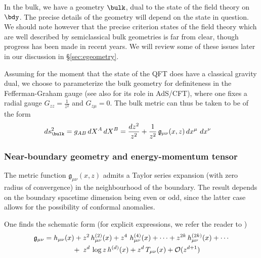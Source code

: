 \documentclass[12pt,openany]{book}
\begin{document}
In the bulk, we have a geometry $\bulk$, dual to the state of the field theory on $\bdy$. The precise details of the geometry will depend on the state in question. We should note however that the precise criterion states of the field theory which are well described by semiclassical bulk geometries is far from clear, though progress has been made in recent years. We will review some of these issues later in our discussion in \S\ref{sec:egeometry}.

 Assuming for the moment that the state of the QFT does have a classical gravity dual, we choose to parameterize the bulk geometry for definiteness in the Fefferman-Graham gauge \cite{Fefferman:1985aa} (see also \cite{deHaro:2000vlm} for its role in AdS/CFT), where one fixes a radial gauge $G_{zz} =\frac{1}{z^2}$ and $G_{z\mu}=0$. The bulk metric can thus be taken to be of the form
%
\begin{align}
ds^2_\bulk &= g_{AB}\, dX^A\, dX^B = \frac{dz^2}{z^2} + \frac{1}{z^2} \, \mathfrak{g}_{\mu\nu}(x,z)\, dx^\mu \ dx^\nu
\label{eq:bulkmet}
\end{align}
%

\subsubsection{Near-boundary geometry and energy-momentum tensor}


The metric function $\mathfrak{g}_{\mu\nu}(x,z)$ admits a Taylor series expansion (with zero radius of convergence) in the neighbourhood of the boundary. The result depends on the boundary spacetime dimension being  even or odd, since the latter case allows for the possibility of conformal anomalies.

One finds the schematic form (for explicit expressions, we refer the reader to \cite{deHaro:2000vlm})
%
\begin{align}
\mathfrak{g}_{\mu\nu}  &=
h_{\mu\nu} (x)+ z^2 \, h^{(2)}_{\mu\nu} (x)
+ z^4\, \,h^{(4)}_{\mu\nu} (x)+ \cdots + z^{2k}\, h^{(2k)}_{\mu\nu}(x) + \cdots
\nonumber \\
 & \qquad \qquad +\;
  z^d\, \log z \, h^{(d)}(x) + z^d\, T_{\mu\nu} (x)+ {\cal O}(z^{d+1})
  \label{eq:FGseries}
\end{align}
%
\end{document}
